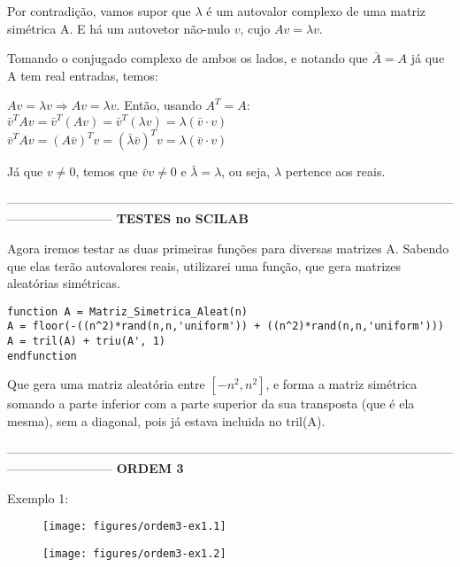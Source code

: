 \documentclass[leqno]{article}
\numberwithin{equation}{section}
\begin{document}
\begin{enumerate}
		Por contradição, vamos supor que $\lambda$ é um autovalor complexo de uma matriz simétrica A. E há um autovetor não-nulo $v$, cujo $A v = \lambda v$.
		
		Tomando o conjugado complexo de ambos os lados, e notando que $\bar{A} = A$ já que A tem real
		entradas, temos:
		
		$Av = \lambda v \Longrightarrow Av = \lambda v$. Então, usando $A^T = A$: \\
		
		$\bar{v}^T A v = \bar{v}^T(Av) = \bar{v}^T(\lambda v) = \lambda (\bar{v} \cdot v)$\\
		$\bar{v}^T A v = (A\bar{v})^T v = (\bar{\lambda}\bar{v})^T v = \lambda (\bar{v} \cdot v)$
		
		Já que $v \neq 0$, temos que $\bar{v}v \neq 0$ e $\bar{\lambda} = \lambda$, ou seja, $\lambda$ pertence aos reais.
		
		--------------------------------------------------------------------------------------------------------------------------------------
		\textbf{{\large TESTES no SCILAB}}
		
		Agora iremos testar as duas primeiras funções para diversas matrizes A. Sabendo que elas terão autovalores reais, utilizarei uma função, que gera matrizes aleatórias simétricas.
		
		\begin{lstlisting}
function A = Matriz_Simetrica_Aleat(n)   
A = floor(-((n^2)*rand(n,n,'uniform')) + ((n^2)*rand(n,n,'uniform')))
A = tril(A) + triu(A', 1)
endfunction
		\end{lstlisting}
		Que gera uma matriz aleatória entre $[-n^2, n^2]$, e forma a matriz simétrica somando a parte inferior com a parte superior da sua transposta (que é ela mesma), sem a diagonal, pois já estava incluida no tril(A).
		
		--------------------------------------------------------------------------------------------------------------------------------------
		\textbf{{\large ORDEM 3}}
		
		Exemplo 1:
		
		\begin{figure}[H]
			\centering
			\texttt{[image: figures/ordem3-ex1.1]}
		\end{figure}
		
		\begin{figure}[H]
			\centering
			\texttt{[image: figures/ordem3-ex1.2]}
		\end{figure}
	

\end{enumerate}
\end{document}

